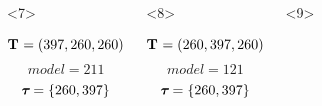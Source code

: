 \begin{frame}
\begin{columns}[c]
\begin{onlyenv}
\begin{minipage}[c][0.5\textheight][c]{\linewidth}
\begin{displaybox}[0.95\linewidth]
\begin{minipage}[c][0.45\textheight][c]{0.95\linewidth}
                    \end{minipage}
                \end{displaybox}
            \end{minipage}
        \end{onlyenv}
        \begin{onlyenv}<7>
            \begin{minipage}[c][0.5\textheight][c]{\linewidth}
                \begin{displaybox}[0.95\linewidth]
                    \begin{minipage}[c][0.45\textheight][c]{0.95\linewidth}
                        \[
                            \mathbf{T_{}} = (397,260,260)
                        \]\vspace{0mm}
                        \[
                            model = 211
                        \]\vspace{0mm}
                        \[
                            \boldsymbol{\tau_{}} = \{260,397\}
                        \]\vspace{0mm}
                    \end{minipage}
                \end{displaybox}
            \end{minipage}
        \end{onlyenv}
        \begin{onlyenv}<8>
            \begin{minipage}[c][0.5\textheight][c]{\linewidth}
                \begin{displaybox}[0.95\linewidth]
                    \begin{minipage}[c][0.45\textheight][c]{0.95\linewidth}
                        \[
                            \mathbf{T_{}} = (260,397,260)
                        \]\vspace{0mm}
                        \[
                            model = 121
                        \]\vspace{0mm}
                        \[
                            \boldsymbol{\tau_{}} = \{260,397\}
                        \]\vspace{0mm}
                    \end{minipage}
                \end{displaybox}
            \end{minipage}
        \end{onlyenv}
        \begin{onlyenv}<9>

\end{onlyenv}
\end{columns}
\end{frame}

